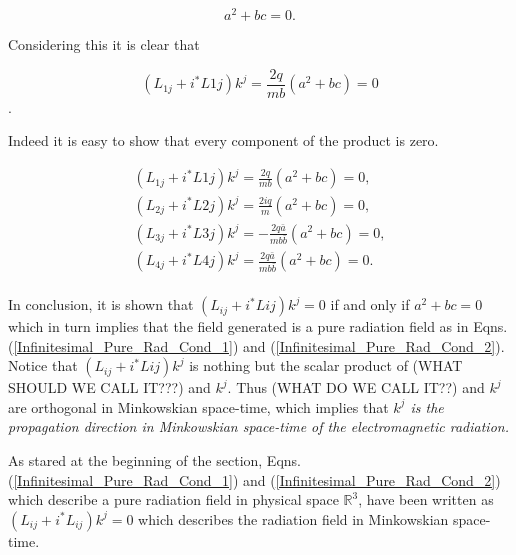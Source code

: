 \begin{equation*}   
a^2 + bc = 0.
\end{equation*}

\noindent Considering this it is clear that 

$$(L_{1j} + i ^*L{1j}) k^j  = \frac{2q}{mb} (a^2 + bc) = 0$$.

\noindent Indeed it is easy to show that every component of the product is zero.

\begin{gather*}
(L_{1j} + i ^*L{1j}) k^j  = \frac{2q}{mb} (a^2 + bc) = 0, \\
(L_{2j} + i ^*L{2j}) k^j  = \frac{2iq}{m} (a^2 + bc) = 0, \\
(L_{3j} + i ^*L{3j}) k^j  = -\frac{2q\bar{a}}{mb\bar{b}} (a^2 + bc) = 0, \\
(L_{4j} + i ^*L{4j}) k^j  = \frac{2q\bar{a}}{mb\bar{b}} (a^2 + bc) = 0. \\
\end{gather*}

In conclusion, it is shown that $(L_{ij} + i ^*L{ij}) k^j = 0$ if and only if $a^2 + bc = 0$ which in turn implies that the field generated is a pure radiation field as in Eqns.(\ref{Infinitesimal_Pure_Rad_Cond_1}) and (\ref{Infinitesimal_Pure_Rad_Cond_2}). Notice that $(L_{ij} + i ^*L{ij}) k^j$ is nothing but the scalar product of (WHAT SHOULD WE CALL IT???) and $k^j$. Thus (WHAT DO WE CALL IT??) and $k^j$ are orthogonal in Minkowskian space-time, which implies that \textit{$k^j$ is the propagation direction in Minkowskian space-time of the electromagnetic radiation.}

As stared at the beginning of the section, Eqns.(\ref{Infinitesimal_Pure_Rad_Cond_1}) and (\ref{Infinitesimal_Pure_Rad_Cond_2}) which describe a pure radiation field in physical space $\mathbb{R}^3$, have been written as $(L_{ij} + i ^*L_{ij}) k^j = 0$ which describes the radiation field in Minkowskian space-time.
   




  










